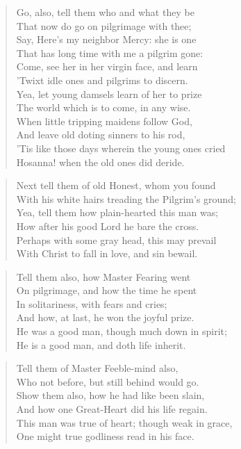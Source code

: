\begin{verse}
Go, also, tell them who and what they be\\
That now do go on pilgrimage with thee;\\
Say, Here's my neighbor Mercy: she is one\\
That has long time with me a pilgrim gone:\\
Come, see her in her virgin face, and learn\\
'Twixt idle ones and pilgrims to discern.\\
Yea, let young damsels learn of her to prize\\
The world which is to come, in any wise.\\
When little tripping maidens follow God,\\
And leave old doting sinners to his rod,\\
'Tis like those days wherein the young ones cried\\
Hosanna! when the old ones did deride.\\
\end{verse}
\begin{verse}
Next tell them of old Honest, whom you found\\
With his white hairs treading the Pilgrim's ground;\\
Yea, tell them how plain-hearted this man was;\\
How after his good Lord he bare the cross.\\
Perhaps with some gray head, this may prevail\\
With Christ to fall in love, and sin bewail.\\
\end{verse}
\begin{verse}
Tell them also, how Master Fearing went\\
On pilgrimage, and how the time he spent\\
In solitariness, with fears and cries;\\
And how, at last, he won the joyful prize.\\
He was a good man, though much down in spirit;\\
He is a good man, and doth life inherit.\\
\end{verse}
\begin{verse}
Tell them of Master Feeble-mind also,\\
Who not before, but still behind would go.\\
Show them also, how he had like been slain,\\
And how one Great-Heart did his life regain.\\
This man was true of heart; though weak in grace,\\
One might true godliness read in his face.\\
\end{verse}
